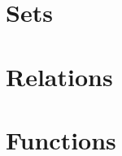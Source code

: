\section{Sets}
    
\clearpage

\section{Relations}
    
\clearpage

\section{Functions}
    
\clearpage